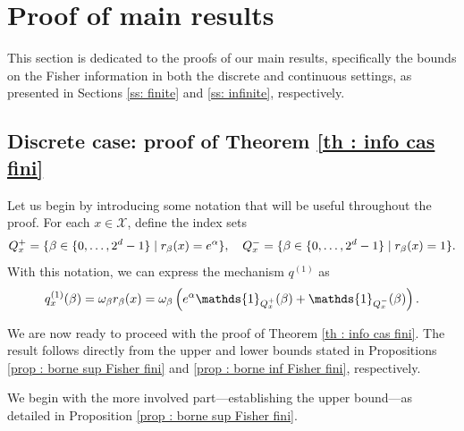 \documentclass[a4paper, 11pt]{article}
\theoremstyle{definition}
\newcommand{\indi}[1]{\mathds{1}_{#1}}
\begin{document}
{\section{Proof of main results}{\label{s: proof main}}

This section is dedicated to the proofs of our main results, specifically the bounds on the Fisher information in both the discrete and continuous settings, as presented in Sections \ref{ss: finite} and \ref{ss: infinite}, respectively.

\subsection{Discrete case: proof of Theorem \ref{th : info cas fini}}

Let us begin by introducing some notation that will be useful throughout the proof.
For each $x \in \mathcal{X}$, define the index sets
\begin{equation}{\label{eq: set Qx+-}}
Q^+_x = \{ \beta \in \{0, \dots, 2^d - 1\} \mid r_\beta(x) = e^\alpha \}, \quad 
Q^-_x = \{ \beta \in \{0, \dots, 2^d - 1\} \mid r_\beta(x) = 1 \}.
\end{equation}
With this notation, we can express the mechanism $q^{(1)}$ as
\begin{equation}{\label{eq: mechanism q1}}
q^{(1)}_x(\beta) = \omega_\beta r_\beta(x) = \omega_\beta \left( e^\alpha \indi{Q^+_x}(\beta) + \indi{Q^-_x}(\beta) \right).
\end{equation}

We are now ready to proceed with the proof of Theorem \ref{th : info cas fini}. The result follows directly from the upper and lower bounds stated in Propositions \ref{prop : borne sup Fisher fini} and \ref{prop : borne inf Fisher fini}, respectively.

We begin with the more involved part—establishing the upper bound—as detailed in Proposition \ref{prop : borne sup Fisher fini}.



}
\end{document}
